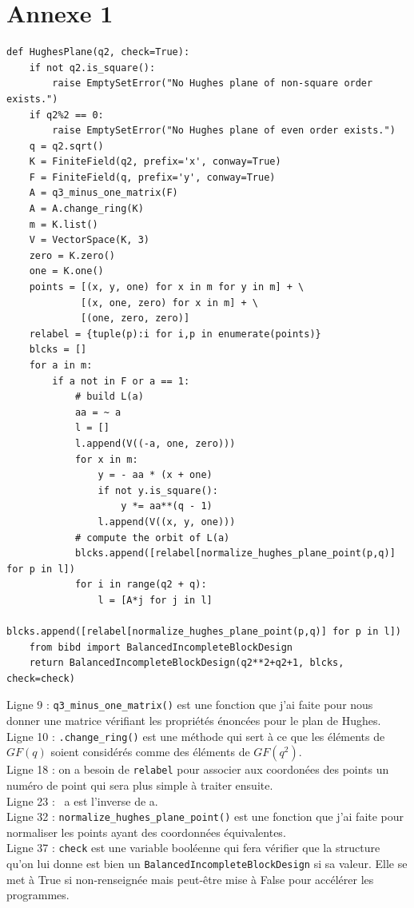 \documentclass[a4paper]{article}
\begin{document}
\newpage
\thispagestyle{empty}
\section*{Annexe 1}
\begin{lstlisting}
def HughesPlane(q2, check=True):
    if not q2.is_square():
        raise EmptySetError("No Hughes plane of non-square order exists.")
    if q2%2 == 0:
        raise EmptySetError("No Hughes plane of even order exists.")
    q = q2.sqrt()
    K = FiniteField(q2, prefix='x', conway=True)
    F = FiniteField(q, prefix='y', conway=True)
    A = q3_minus_one_matrix(F)
    A = A.change_ring(K)
    m = K.list()
    V = VectorSpace(K, 3)
    zero = K.zero()
    one = K.one()
    points = [(x, y, one) for x in m for y in m] + \
             [(x, one, zero) for x in m] + \
             [(one, zero, zero)]
    relabel = {tuple(p):i for i,p in enumerate(points)}
    blcks = []
    for a in m:
        if a not in F or a == 1:
            # build L(a)
            aa = ~ a
            l = []
            l.append(V((-a, one, zero)))
            for x in m:
                y = - aa * (x + one)
                if not y.is_square():
                    y *= aa**(q - 1)
                l.append(V((x, y, one)))
            # compute the orbit of L(a)
            blcks.append([relabel[normalize_hughes_plane_point(p,q)] for p in l])
            for i in range(q2 + q):
                l = [A*j for j in l]
                blcks.append([relabel[normalize_hughes_plane_point(p,q)] for p in l])
    from bibd import BalancedIncompleteBlockDesign
    return BalancedIncompleteBlockDesign(q2**2+q2+1, blcks, check=check)
\end{lstlisting}
\bigskip
Ligne 9 : \texttt{q3\_minus\_one\_matrix()} est une fonction que j'ai faite pour nous donner une matrice vérifiant les propriétés énoncées pour le plan de Hughes. \smallskip\\
Ligne 10 : \texttt{.change\_ring()} est une méthode qui sert à ce que les éléments de $GF(q)$ soient considérés comme des éléments de $GF(q^2)$.\smallskip\\
Ligne 18 : on a besoin de \texttt{relabel} pour associer aux coordonées des points un numéro de point qui sera plus simple à traiter ensuite.\smallskip\\
Ligne 23 : ~a est l'inverse de a.\smallskip\\
Ligne 32 : \texttt{normalize\_hughes\_plane\_point()} est une fonction que j'ai faite pour normaliser les points ayant des coordonnées équivalentes.\smallskip\\
Ligne 37 : \texttt{check} est une variable booléenne qui fera vérifier que la structure qu'on lui donne est bien un \texttt{BalancedIncompleteBlockDesign} si sa valeur. Elle se met à True si non-renseignée mais peut-être mise à False pour accélérer les programmes.
\newpage
\thispagestyle{empty}
\end{document}
